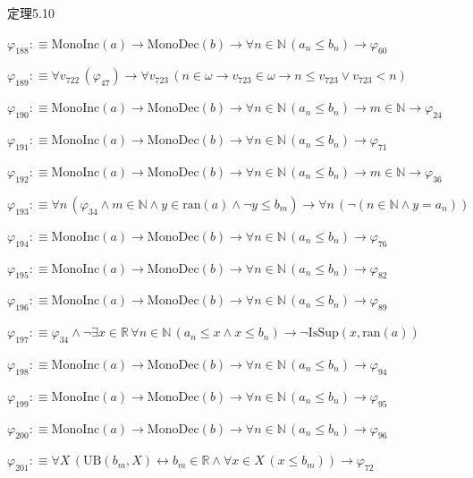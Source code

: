 \begin{fullproof}{定理5.10}
\begin{abbrevlist}
\item $\varphi_{188} :\equiv \mathrm{MonoInc}(a) \to \mathrm{MonoDec}(b) \to \forall n \in \mathbb{N}\,(a_{n} \leq b_{n}) \to \varphi_{60}$
\item $\varphi_{189} :\equiv \forall v_{722}\,(\varphi_{47}) \to \forall v_{723}\,(n \in \omega \to v_{723} \in \omega \to n \leq v_{723} \lor v_{723} < n)$
\item $\varphi_{190} :\equiv \mathrm{MonoInc}(a) \to \mathrm{MonoDec}(b) \to \forall n \in \mathbb{N}\,(a_{n} \leq b_{n}) \to m \in \mathbb{N} \to \varphi_{24}$
\item $\varphi_{191} :\equiv \mathrm{MonoInc}(a) \to \mathrm{MonoDec}(b) \to \forall n \in \mathbb{N}\,(a_{n} \leq b_{n}) \to \varphi_{71}$
\item $\varphi_{192} :\equiv \mathrm{MonoInc}(a) \to \mathrm{MonoDec}(b) \to \forall n \in \mathbb{N}\,(a_{n} \leq b_{n}) \to m \in \mathbb{N} \to \varphi_{36}$
\item $\varphi_{193} :\equiv \forall n\,(\varphi_{34} \land m \in \mathbb{N} \land y \in \mathrm{ran}(a) \land \neg y \leq b_{m}) \to \forall n\,(\neg (n \in \mathbb{N} \land y = a_{n}))$
\item $\varphi_{194} :\equiv \mathrm{MonoInc}(a) \to \mathrm{MonoDec}(b) \to \forall n \in \mathbb{N}\,(a_{n} \leq b_{n}) \to \varphi_{76}$
\item $\varphi_{195} :\equiv \mathrm{MonoInc}(a) \to \mathrm{MonoDec}(b) \to \forall n \in \mathbb{N}\,(a_{n} \leq b_{n}) \to \varphi_{82}$
\item $\varphi_{196} :\equiv \mathrm{MonoInc}(a) \to \mathrm{MonoDec}(b) \to \forall n \in \mathbb{N}\,(a_{n} \leq b_{n}) \to \varphi_{89}$
\item $\varphi_{197} :\equiv \varphi_{34} \land \neg \exists x \in \mathbb{R}\,\forall n \in \mathbb{N}\,(a_{n} \leq x \land x \leq b_{n}) \to \neg \mathrm{IsSup}(x,\mathrm{ran}(a))$
\item $\varphi_{198} :\equiv \mathrm{MonoInc}(a) \to \mathrm{MonoDec}(b) \to \forall n \in \mathbb{N}\,(a_{n} \leq b_{n}) \to \varphi_{94}$
\item $\varphi_{199} :\equiv \mathrm{MonoInc}(a) \to \mathrm{MonoDec}(b) \to \forall n \in \mathbb{N}\,(a_{n} \leq b_{n}) \to \varphi_{95}$
\item $\varphi_{200} :\equiv \mathrm{MonoInc}(a) \to \mathrm{MonoDec}(b) \to \forall n \in \mathbb{N}\,(a_{n} \leq b_{n}) \to \varphi_{96}$
\item $\varphi_{201} :\equiv \forall X\,(\mathrm{UB}(b_{m},X) \leftrightarrow b_{m} \in \mathbb{R} \land \forall x \in X\,(x \leq b_{m})) \to \varphi_{72}$

\end{abbrevlist}
\end{fullproof}
